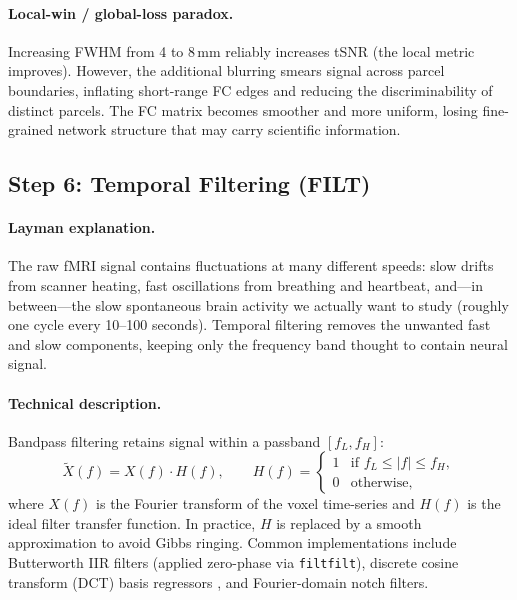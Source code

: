 \documentclass[11pt,a4paper]{article}
\begin{document}
\paragraph{Local-win / global-loss paradox.}
Increasing FWHM from 4 to 8\,mm reliably increases tSNR (the local metric improves).  However, the additional blurring smears signal across parcel boundaries, inflating short-range FC edges and reducing the discriminability of distinct parcels.  The FC matrix becomes smoother and more uniform, losing fine-grained network structure that may carry scientific information.

\subsection{Step 6: Temporal Filtering (FILT)}
\label{app:filt}

\paragraph{Layman explanation.}
The raw fMRI signal contains fluctuations at many different speeds: slow drifts from scanner heating, fast oscillations from breathing and heartbeat, and---in between---the slow spontaneous brain activity we actually want to study (roughly one cycle every 10--100 seconds).  Temporal filtering removes the unwanted fast and slow components, keeping only the frequency band thought to contain neural signal.

\paragraph{Technical description.}
Bandpass filtering retains signal within a passband $[f_L, f_H]$:
\begin{equation}
    \tilde{X}(f) = X(f) \cdot H(f), \qquad H(f) = \begin{cases} 1 & \text{if } f_L \le |f| \le f_H, \\ 0 & \text{otherwise,} \end{cases}
\end{equation}
where $X(f)$ is the Fourier transform of the voxel time-series and $H(f)$ is the ideal filter transfer function.  In practice, $H$ is replaced by a smooth approximation to avoid Gibbs ringing.  Common implementations include Butterworth IIR filters (applied zero-phase via \texttt{filtfilt}), discrete cosine transform (DCT) basis regressors \citep{friston2000}, and Fourier-domain notch filters.
\end{document}
